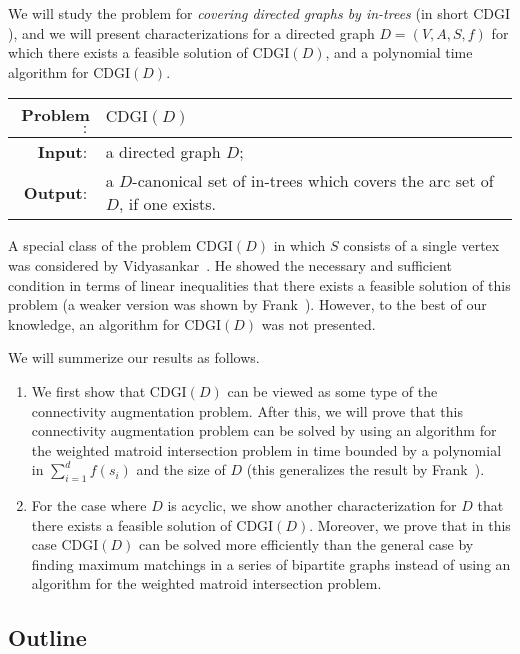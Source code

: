 \documentclass[11pt]{article}
\newcounter{ni}
\newcounter{san}
\theoremstyle{plain}
\begin{document}
We will study the problem for 
{\it covering directed graphs by in-trees} (in short $\mbox{CDGI}$), 
and we will present characterizations for a directed graph $D=(V,A,S,f)$ 
for which there exists a feasible solution of $\mbox{CDGI}(D)$, and 
a polynomial time algorithm for $\mbox{CDGI}(D)$. 
\begin{center}
\begin{tabularx}{150mm}{rX}
\hline
{\bf Problem$\colon$} & $\mbox{CDGI}(D)$ 
\\
\hline 
{\bf Input$\colon$} & a directed graph $D$; \\
{\bf Output$\colon$} &
a $D$-canonical set of in-trees which covers the arc set of $D$, if one exists.\\
\hline
\end{tabularx}
\end{center}
A special class of the problem $\mbox{CDGI}(D)$ in which $S$ consists of a single vertex 
was considered by Vidyasankar~\cite{V78}. 
He showed the necessary and sufficient condition 
in terms of linear inequalities 
that there exists a feasible solution of this problem
(a weaker version was shown by Frank~\cite{F79}).
However, to the best of our knowledge, 
an algorithm for $\mbox{CDGI}(D)$ was not 
presented.

We will summerize our results as follows. 
\begin{enumerate}
\item 
We first show that $\mbox{CDGI}(D)$ can be viewed as some type of 
the connectivity augmentation problem. After this, 
we will prove that 
this connectivity augmentation problem can be solved by using 
an algorithm for the weighted matroid intersection problem in time bounded by a polynomial in 
$\sum_{i=1}^d f(s_i)$ and the size of $D$ 
(this generalizes the result by Frank~\cite{F06}). 
\item
For the case where $D$ is acyclic, we show another characterization for $D$ 
that there exists a feasible solution of $\mbox{CDGI}(D)$. Moreover, we prove that 
in this case $\mbox{CDGI}(D)$ can be solved more efficiently than the general case by 
finding maximum matchings in a series of bipartite graphs instead of using 
an algorithm for the weighted matroid intersection problem. \\
\end{enumerate}

\subsection{Outline}
\end{document}
